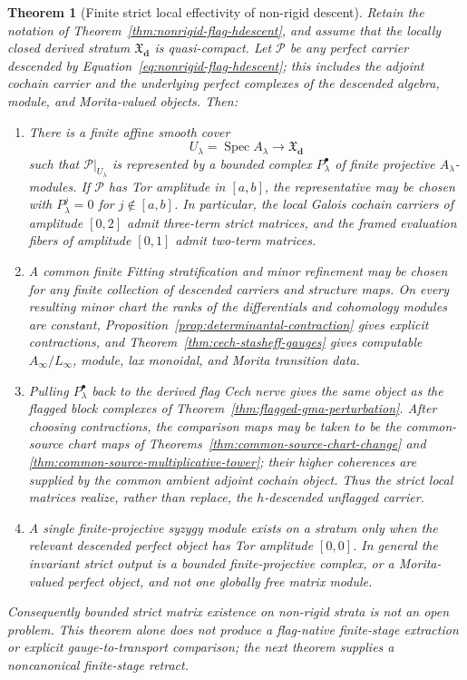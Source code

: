 \documentclass[11pt]{article}
\newtheorem{theorem}{Theorem}[section]
\theoremstyle{definition}
\begin{document}
\begin{theorem}[Finite strict local effectivity of non-rigid descent]\label{thm:nonrigid-strict-local}
Retain the notation of Theorem~\ref{thm:nonrigid-flag-hdescent}, and assume
that the locally closed derived stratum $\mathfrak X_{\mathbf d}$ is
quasi-compact.  Let $\mathcal P$ be any perfect carrier descended by
Equation~\eqref{eq:nonrigid-flag-hdescent}; this includes the adjoint
cochain carrier and the underlying perfect complexes of the descended
algebra, module, and Morita-valued objects.  Then:

\begin{enumerate}[label=\textnormal{(\roman*)}]
\item There is a finite affine smooth cover
\[
 U_\lambda=\operatorname{Spec}A_\lambda
 \longrightarrow \mathfrak X_{\mathbf d}
\]
such that $\mathcal P|_{U_\lambda}$ is represented by a bounded complex
$P_\lambda^\bullet$ of finite projective $A_\lambda$-modules.  If
$\mathcal P$ has Tor amplitude in $[a,b]$, the representative may be chosen
with $P_\lambda^j=0$ for $j\notin[a,b]$.  In particular, the local Galois
cochain carriers of amplitude $[0,2]$ admit three-term strict matrices, and
the framed evaluation fibers of amplitude $[0,1]$ admit two-term matrices.

\item A common finite Fitting stratification and minor refinement may be
chosen for any finite collection of descended carriers and structure maps.
On every resulting minor chart the ranks of the differentials and cohomology
modules are constant, Proposition~\ref{prop:determinantal-contraction}
gives explicit contractions, and Theorem~\ref{thm:cech-stasheff-gauges}
gives computable $A_\infty/L_\infty$, module, lax monoidal, and Morita
transition data.

\item Pulling $P_\lambda^\bullet$ back to the derived flag Cech nerve
gives the same object as the flagged block complexes of
Theorem~\ref{thm:flagged-gma-perturbation}.  After choosing contractions,
the comparison maps may be taken to be the common-source chart maps of
Theorems~\ref{thm:common-source-chart-change} and
\ref{thm:common-source-multiplicative-tower}; their higher coherences are
supplied by the common ambient adjoint cochain object.  Thus the strict local
matrices realize, rather than replace, the $h$-descended unflagged carrier.

\item A single finite-projective syzygy module exists on a stratum only when
the relevant descended perfect object has Tor amplitude $[0,0]$.  In general
the invariant strict output is a bounded finite-projective complex, or a
Morita-valued perfect object, and not one globally free matrix module.
\end{enumerate}

Consequently bounded strict matrix \emph{existence} on non-rigid strata is
not an open problem.  This theorem alone does not produce a flag-native
finite-stage extraction or explicit gauge-to-transport comparison; the next
theorem supplies a noncanonical finite-stage retract.
\end{theorem}
\end{document}
